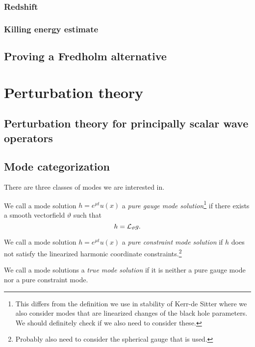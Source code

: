 \documentclass{article}
\begin{document}
\subsubsection{Redshift}

\subsubsection{Killing energy estimate}

\subsection{Proving a Fredholm alternative}

\section{Perturbation theory}

\subsection{Perturbation theory for principally scalar wave operators}

\subsection{Mode categorization}

There are three classes of modes we are interested in.
\begin{definition}
  We call a mode solution $h = e^{\mu t}u(x)$ a \emph{pure gauge mode
    solution}\footnote{This differs from the definition we use in
    stability of Kerr-de Sitter where we also consider modes that are
    linearized changes of the black hole parameters. We should
    definitely check if we also need to consider these.} if there exists a smooth vectorfield
  $\vartheta$ such that
  \begin{equation*}
    h = \mathcal{L}_{\vartheta}g.
  \end{equation*}
\end{definition}

\begin{definition}
  We call a mode solution $h = e^{\mu t}u(x)$ a \emph{pure constraint
    mode solution} if $h$ does not satisfy the linearized harmonic
  coordinate constraints.\footnote{Probably also need to consider the
    spherical gauge that is used.}
\end{definition}

\begin{definition}
  We call a mode solutions a \emph{true mode solution} if it is
  neither a pure gauge mode nor a pure constraint mode. 
\end{definition}
\end{document}
